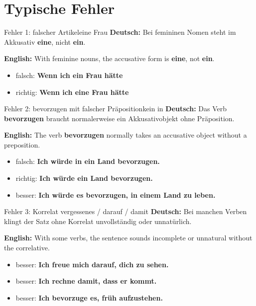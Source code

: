 \documentclass[a4paper,11pt]{article}
\newcommand{\GermanText}[1]{\textbf{Deutsch: }#1\par}
\newcommand{\EnglishText}[1]{{\small\color{SoftGray}\textbf{English: }#1\par}}
\begin{document}
    
    \section{Typische Fehler}
        
        \begin{grammarentry}{Fehler 1: falscher Artikel}{eine Frau}
            \GermanText{Bei femininen Nomen steht im Akkusativ \textbf{eine}, nicht \textbf{ein}.}
            \EnglishText{With feminine nouns, the accusative form is \textbf{eine}, not \textbf{ein}.}
            
            \begin{itemize}
                \item falsch: \textbf{Wenn ich ein Frau hätte}
                \item richtig: \textbf{Wenn ich eine Frau hätte}
            \end{itemize}
        \end{grammarentry}
        
        \begin{grammarentry}{Fehler 2: bevorzugen mit falscher Präposition}{kein in}
            \GermanText{Das Verb \textbf{bevorzugen} braucht normalerweise ein Akkusativobjekt ohne Präposition.}
            \EnglishText{The verb \textbf{bevorzugen} normally takes an accusative object without a preposition.}
            
            \begin{itemize}
                \item falsch: \textbf{Ich würde in ein Land bevorzugen.}
                \item richtig: \textbf{Ich würde ein Land bevorzugen.}
                \item besser: \textbf{Ich würde es bevorzugen, in einem Land zu leben.}
            \end{itemize}
        \end{grammarentry}
        
        \begin{grammarentry}{Fehler 3: Korrelat vergessen}{es / darauf / damit}
            \GermanText{Bei manchen Verben klingt der Satz ohne Korrelat unvollständig oder unnatürlich.}
            \EnglishText{With some verbs, the sentence sounds incomplete or unnatural without the correlative.}
            
            \begin{itemize}
                \item besser: \textbf{Ich freue mich darauf, dich zu sehen.}
                \item besser: \textbf{Ich rechne damit, dass er kommt.}
                \item besser: \textbf{Ich bevorzuge es, früh aufzustehen.}
            \end{itemize}
        \end{grammarentry}
        
\end{document}
